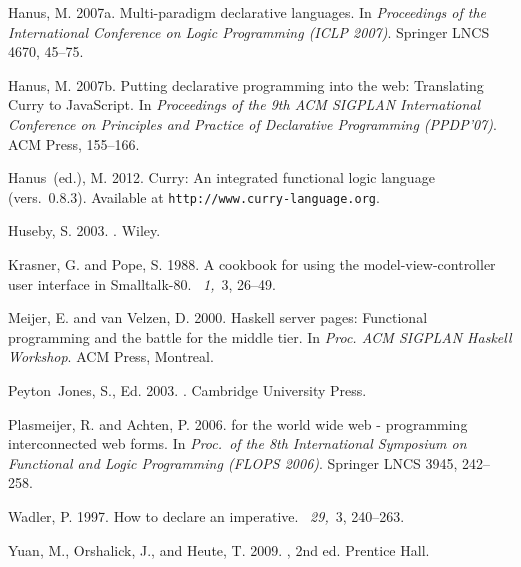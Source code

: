 \documentclass{tlp}
\begin{document}
\begin{thebibliography}{}
{\sc Hanus, M.} 2007a.
\newblock Multi-paradigm declarative languages.
\newblock In {\em Proceedings of the International Conference on Logic
  Programming (ICLP 2007)}. Springer LNCS 4670, 45--75.

{\sc Hanus, M.} 2007b.
\newblock Putting declarative programming into the web: Translating {Curry} to
  {JavaScript}.
\newblock In {\em Proceedings of the 9th ACM SIGPLAN International Conference
  on Principles and Practice of Declarative Programming (PPDP'07)}. ACM Press,
  155--166.

{\sc Hanus~(ed.), M.} 2012.
\newblock Curry: An integrated functional logic language (vers.\ 0.8.3).
\newblock Available at \verb+http://www.curry-language.org+.

{\sc Huseby, S.} 2003.
.
\newblock Wiley.

{\sc Krasner, G.} {\sc and} {\sc Pope, S.} 1988.
\newblock A cookbook for using the model-view-controller user interface in
  Smalltalk-80.
~{\em 1,\/}~3, 26--49.

{\sc Meijer, E.} {\sc and} {\sc van Velzen, D.} 2000.
\newblock Haskell server pages: Functional programming and the battle for the
  middle tier.
\newblock In {\em Proc. ACM SIGPLAN Haskell Workshop}. ACM Press, Montreal.

{\sc Peyton~Jones, S.}, Ed. 2003.
.
\newblock Cambridge University Press.

{\sc Plasmeijer, R.} {\sc and} {\sc Achten, P.} 2006.
 for the world wide web - programming interconnected web
  forms.
\newblock In {\em Proc.\ of the 8th International Symposium on Functional and
  Logic Programming (FLOPS 2006)}. Springer LNCS 3945, 242--258.

{\sc Wadler, P.} 1997.
\newblock How to declare an imperative.
~{\em 29,\/}~3, 240--263.

{\sc Yuan, M.}, {\sc Orshalick, J.}, {\sc and} {\sc Heute, T.} 2009.
, 2nd ed.
\newblock Prentice Hall.

\end{thebibliography}
\end{document}
